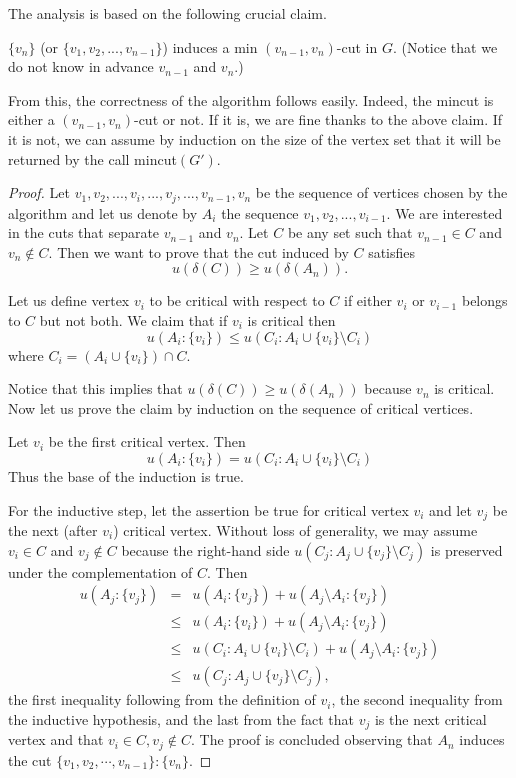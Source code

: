 \documentclass[12pt]{article}
\begin{document}

The analysis is based on the following crucial claim. 
\begin{claim}
$\{v_n\}$ (or $\{v_1,v_2,...,v_{n-1}\}$) induces a
min $(v_{n-1},v_n)$-cut in $G$. (Notice that we do not know in advance
$v_{n-1}$ and $v_n$.)
\end{claim}

From this, the correctness of the algorithm follows easily. Indeed,
the mincut is either a $(v_{n-1},v_n)$-cut or not. If it is, we are
fine thanks to the above claim. If it is not, we
can assume by induction on the size of the vertex set that it will be
returned by the call {\sc mincut}$(G')$.


\begin{proof}
Let $v_1,v_2,...,v_i,...,v_j,...,v_{n-1},v_n$ be the sequence of vertices
chosen by the algorithm and let us denote by $A_i$ the sequence
$v_1,v_2,...,v_{i-1}$. We are interested in the cuts that separate
$v_{n-1}$ and $v_n$. Let $C$ be any set such that $v_{n-1}\in C$ and
$v_n\not\in C$. Then we want to prove that the cut induced by $C$
satisfies
\[
u(\delta(C))\ge u(\delta(A_n)).
\]

Let us define vertex $v_i$ to be critical with respect to $C$  if either
$v_i$ or $v_{i-1}$ belongs to $C$ but not both.
We claim that if $v_i$ is critical then
\[
u(A_i:\{v_i\})\le u(C_i:A_i\cup\{v_i\}\setminus C_i)
\]
where $C_i= (A_i\cup\{v_i\})\cap C$.

Notice that this implies that $u(\delta(C))\ge
u(\delta(A_n))$ because $v_n$ is critical.  Now let us prove the claim
 by induction on the sequence of critical vertices.

Let $v_i$ be the first critical vertex. Then
\[
u(A_i:\{v_{i}\}) = u(C_{i} : A_{i}\cup\{v_{i}\}\setminus C_i)
\]
Thus the base of the induction is true.

For the inductive step, let the assertion be true for critical vertex
$v_i$ and let $v_j$ be the next (after $v_i$) critical vertex. Without loss of generality, we may assume $v_i \in C$ and $v_j \not\in C$ because the right-hand side $u(C_j:A_j\cup\{v_j\}\setminus C_j)$ is preserved under the complementation of $C$.
Then
\begin{eqnarray*}
u(A_j:\{v_j\}) &=& u(A_i:\{v_j\})+u(A_j\setminus A_i:\{v_j\})\\
&\le& u(A_i:\{v_i\})+u(A_j\setminus A_i:\{v_j\})\\
&\le& u(C_i:A_i\cup\{v_i\}\setminus C_i)+u(A_j\setminus A_i:\{v_j\})\\
&\le& u(C_j:A_j\cup\{v_j\}\setminus C_j),
\end{eqnarray*}
the first inequality following from the definition of $v_i$, the
second inequality from the inductive hypothesis, and the last from the
fact that $v_j$ is the next critical vertex and that $v_i \in C, v_j \not\in C$.
The proof is concluded observing that $A_n$ induces the cut
$\{v_1,v_2,\cdots,v_{n-1}\} : \{v_n\}$.
\end{proof}
\end{document}
